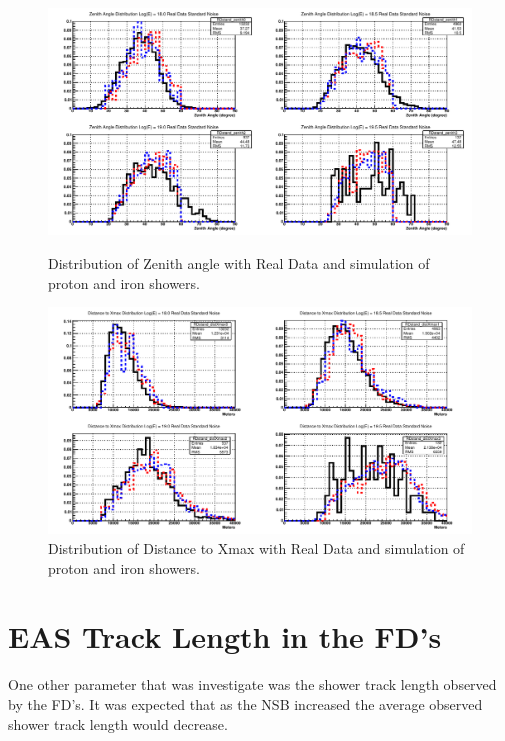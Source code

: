 \begin{figure}
\centering
\includegraphics[width=\textwidth]{chapters/graphs/SelectionEff/RealDataAndSim_ZenithDistComp.pdf}
\caption{Distribution of Zenith angle with Real Data and simulation of proton and iron showers.}
\vspace{3mm}
\includegraphics[width=\textwidth]{chapters/graphs/SelectionEff/RealDataAndSim_DistToXmaxDistComp.pdf}
\caption{Distribution of Distance to Xmax with Real Data and simulation of proton and iron showers.}
\end{figure}

\section{EAS Track Length in the FD's}

One other parameter that was investigate was the shower track length observed by the FD's. It was expected that as the NSB increased the average observed shower track length would decrease. 

